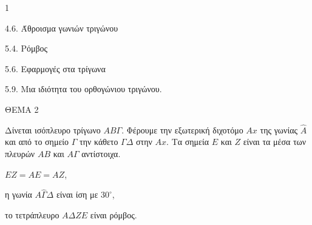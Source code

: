 \begin{ylh}{1}
    \item 4.6. Άθροισμα γωνιών τριγώνου
    \item 5.4. Ρόμβος
    \item 5.6. Εφαρμογές στα τρίγωνα
    \item 5.9. Μια ιδιότητα του ορθογώνιου τριγώνου.
\end{ylh}

ΘΕΜΑ 2

Δίνεται ισόπλευρο τρίγωνο $AB\Gamma$. Φέρουμε την εξωτερική διχοτόμο $Ax$ της γωνίας $\widehat{A}$ και από το σημείο $\Gamma$ την κάθετο $\Gamma\Delta$ στην $Ax$. Τα σημεία $E$ και $Z$ είναι τα μέσα των πλευρών $AB$ και $A\Gamma$ αντίστοιχα.

\begin{alist}
\item $EZ = AE = AZ$, 
\item η γωνία $A\widehat{\Gamma}\Delta$ είναι ίση με $30^{\circ}$, 
\item το τετράπλευρο $A\Delta ZE$ είναι ρόμβος. 

\begin{center}
\end{center}
\end{alist}
